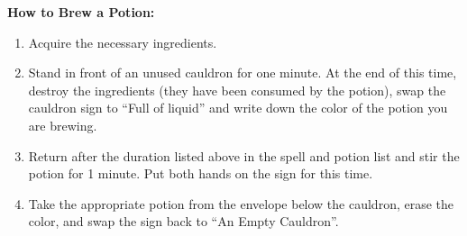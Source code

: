 \documentclass[green]{NeptuneBall}
\begin{document}
{\bf How to Brew a Potion:}\\ %
\begin{enumerate}
  \item Acquire the necessary ingredients.
  \item Stand in front of an unused cauldron for one minute. At the end of this time, destroy the ingredients (they have been consumed by the potion), swap the cauldron sign to ``Full of liquid'' and write down the color of the potion you are brewing.
  \item Return after the duration listed above in the spell and potion list and stir the potion for 1 minute. Put both hands on the sign for this time.
  \item Take the appropriate potion from the envelope below the cauldron, erase the color, and swap the sign back to ``An Empty Cauldron''.
\end{enumerate}
\end{document}
